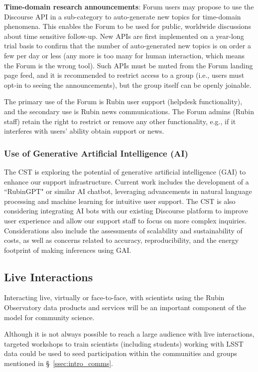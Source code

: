 \documentclass[DM,authoryear,toc]{lsstdoc}
\begin{document}
{\bf Time-domain research announcements}:
Forum users may propose to use the Discourse API in a sub-category to auto-generate new topics for time-domain phenomena.
This enables the Forum to be used for public, worldwide discussions about time sensitive follow-up. 
New APIs are first implemented on a year-long trial basis to confirm that the number of auto-generated new topics is on order a few per day or less (any more is too many for human interaction, which means the Forum is the wrong tool).
Such APIs must be muted from the Forum landing page feed, and it is recommended to restrict access to a group (i.e., users must opt-in to seeing the announcements), but the group itself can be openly joinable.

The primary use of the Forum is Rubin user support (helpdesk functionality), and the secondary use is Rubin news communications.
The Forum admins (Rubin staff) retain the right to restrict or remove any other functionality, e.g., if it interferes with users' ability obtain support or news.


\subsubsection{Use of Generative Artificial Intelligence (AI)}\label{sssec:use_ai}

The CST is exploring the potential of generative artificial intelligence (GAI) to enhance our support infrastructure.
Current work includes the development of a ``RubinGPT" or similar AI chatbot, leveraging advancements in natural language processing and machine learning for intuitive user support.
The CST is also considering integrating AI bots with our existing Discourse platform to improve user experience and allow our support staff to focus on more complex inquiries.
Considerations also include the assessments of scalability and sustainability of costs, as well as concerns related to accuracy, reproducibility, and the energy footprint of making inferences using GAI. 


\subsection{Live Interactions}\label{ssec:mod_interact}

Interacting live, virtually or face-to-face, with scientists using the Rubin Observatory data products and services will be an important component of the model for community science.

Although it is not always possible to reach a large audience with live interactions, targeted workshops to train scientists (including students) working with LSST data could be used to seed participation within the communities and groups mentioned in \S~\ref{ssec:intro_comms}.
\end{document}
